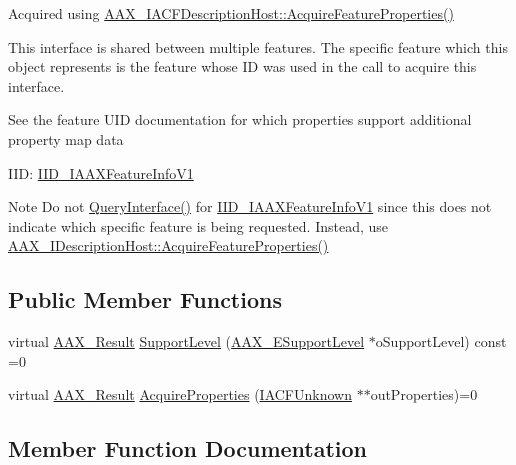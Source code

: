 Acquired using \mbox{\hyperlink{a01649_ae4b0144bfdfdbd5881150c20eef1c48f}{A\+A\+X\+\_\+\+I\+A\+C\+F\+Description\+Host\+::\+Acquire\+Feature\+Properties()}}

This interface is shared between multiple features. The specific feature which this object represents is the feature whose ID was used in the call to acquire this interface.

See the feature U\+ID documentation for which properties support additional property map data

I\+ID\+: \mbox{\hyperlink{a00683_a4bc11f4b2a3f9c7ca9162c6b3689978e}{I\+I\+D\+\_\+\+I\+A\+A\+X\+Feature\+Info\+V1}}

\begin{DoxyNote}{Note}
Do not {\ttfamily \mbox{\hyperlink{a01409_a8b7f0ae9c78d007ca76aa462ebe53135}{Query\+Interface()}}} for \mbox{\hyperlink{a00683_a4bc11f4b2a3f9c7ca9162c6b3689978e}{I\+I\+D\+\_\+\+I\+A\+A\+X\+Feature\+Info\+V1}} since this does not indicate which specific feature is being requested. Instead, use \mbox{\hyperlink{a01793_aa0d9e27d0207113f98c217d870bfa5e9}{A\+A\+X\+\_\+\+I\+Description\+Host\+::\+Acquire\+Feature\+Properties()}} 
\end{DoxyNote}
\subsection*{Public Member Functions}
\begin{DoxyCompactItemize}
\item 
virtual \mbox{\hyperlink{a00392_a4d8f69a697df7f70c3a8e9b8ee130d2f}{A\+A\+X\+\_\+\+Result}} \mbox{\hyperlink{a01689_a5973ec7e7dbb4cb566df58cfacdfcafd}{Support\+Level}} (\mbox{\hyperlink{a00491_aca7bf42860665d5da66f4ac342e761b3}{A\+A\+X\+\_\+\+E\+Support\+Level}} $\ast$o\+Support\+Level) const =0
\item 
virtual \mbox{\hyperlink{a00392_a4d8f69a697df7f70c3a8e9b8ee130d2f}{A\+A\+X\+\_\+\+Result}} \mbox{\hyperlink{a01689_a6ea3222257cdc9395ad5a766d4130df8}{Acquire\+Properties}} (\mbox{\hyperlink{a01409}{I\+A\+C\+F\+Unknown}} $\ast$$\ast$out\+Properties)=0
\end{DoxyCompactItemize}


\subsection{Member Function Documentation}
\mbox{\label{a01689_a5973ec7e7dbb4cb566df58cfacdfcafd}} 
